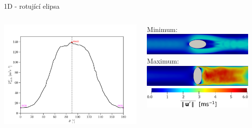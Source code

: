 \documentclass[aspectratio=169,xcolor=dvipsnames]{beamer}
\begin{document}
\begin{frame}{1D - rotující elipsa}
	\addtocounter{framenumber}{-1}
	\begin{columns}
		\begin{column}{.56\textwidth}
			\includegraphics[width=1\linewidth, trim={0 0 0 0}, clip]{Images/elip1interpolated.pdf}			
		\end{column}
		\begin{column}{.52\textwidth}
			Minimum:\\[4pt]
			\includegraphics[width=0.9\linewidth, trim={0 0 0 0}, clip]{Images/ellipse1_min_a.png}
			\\ \vspace{2mm}
			Maximum:\\[4pt]	
			\includegraphics[width=0.9\linewidth, trim={0 0 0 0}, clip]{Images/ellipse1_max_a.png}
			\\ \vspace{4mm}		
			\centering
			\hspace{-6mm}\includegraphics[width=0.6\linewidth, trim={0 0 0 0}, clip]{Images/ellipse12_legenda.png}
		\end{column}
	\end{columns}
\end{frame}
\end{document}
